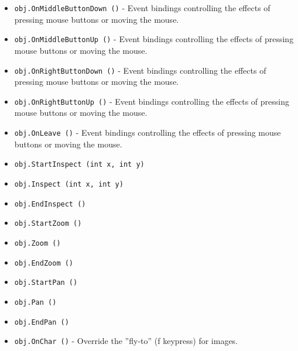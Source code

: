 \begin{itemize}
\item  \verb|obj.OnMiddleButtonDown ()| -  Event bindings controlling the effects of pressing mouse buttons
 or moving the mouse.

\item  \verb|obj.OnMiddleButtonUp ()| -  Event bindings controlling the effects of pressing mouse buttons
 or moving the mouse.

\item  \verb|obj.OnRightButtonDown ()| -  Event bindings controlling the effects of pressing mouse buttons
 or moving the mouse.

\item  \verb|obj.OnRightButtonUp ()| -  Event bindings controlling the effects of pressing mouse buttons
 or moving the mouse.

\item  \verb|obj.OnLeave ()| -  Event bindings controlling the effects of pressing mouse buttons
 or moving the mouse.

\item  \verb|obj.StartInspect (int x, int y)|

\item  \verb|obj.Inspect (int x, int y)|

\item  \verb|obj.EndInspect ()|

\item  \verb|obj.StartZoom ()|

\item  \verb|obj.Zoom ()|

\item  \verb|obj.EndZoom ()|

\item  \verb|obj.StartPan ()|

\item  \verb|obj.Pan ()|

\item  \verb|obj.EndPan ()|

\item  \verb|obj.OnChar ()| -  Override the ''fly-to'' (f keypress) for images.

\end{itemize}
